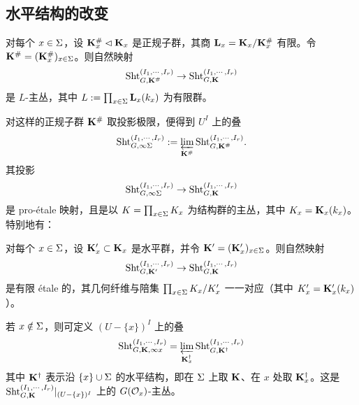\subsection{水平结构的改变}\label{ss:change level}


对每个 $x\in \Sigma$，设 $\mathbf{K}^{\#}_{x}\lhd \mathbf{K}_{x}$ 是正规子群，其商 $\mathbf{L}_{x}=\mathbf{K}_{x}/\mathbf{K}^{\#}_{x}$ 有限。令 $\mathbf{K}^{\#}=(\mathbf{K}^{\#}_{x})_{x\in \Sigma}$。则自然映射
\begin{equation*}
\textup{Sht}^{(I_{1},\cdots, I_{r})}_{G,\mathbf{K}^{\#}} \to \textup{Sht}^{(I_{1},\cdots, I_{r})}_{G,\mathbf{K}}
\end{equation*}
是 $L$-主丛，其中 $L:=\prod_{x\in \Sigma}\mathbf{L}_{x}(k_{x})$ 为有限群。

对这样的正规子群 $\mathbf{K}^{\#}$ 取投影极限，便得到 $U^{I}$ 上的叠
\begin{equation*}
\textup{Sht}^{(I_{1},\cdots, I_{r})}_{G,\infty\Sigma} :=\varprojlim_{\mathbf{K}^{\#}}\textup{Sht}^{(I_{1},\cdots, I_{r})}_{G,\mathbf{K}^{\#}}.
\end{equation*}
其投影
\begin{equation*}
\textup{Sht}^{(I_{1},\cdots, I_{r})}_{G,\infty\Sigma}\to \textup{Sht}^{(I_{1},\cdots, I_{r})}_{G,\mathbf{K}}
\end{equation*}
是 pro-\'etale 映射，且是以 $K=\prod_{x\in \Sigma}K_{x}$ 为结构群的主丛，其中 $K_{x}=\mathbf{K}_{x}(k_{x})$。特别地有：

\begin{lem}\label{l:change level Sig}
对每个 $x\in \Sigma$，设 $\mathbf{K}'_{x}\subset \mathbf{K}_{x}$ 是水平群，并令 $\mathbf{K}'=(\mathbf{K}'_{x})_{x\in \Sigma}$。则自然映射
\begin{equation*}
\textup{Sht}^{(I_{1},\cdots, I_{r})}_{G,\mathbf{K}'} \to \textup{Sht}^{(I_{1},\cdots, I_{r})}_{G,\mathbf{K}}
\end{equation*}
是有限 \'etale 的，其几何纤维与陪集 $\prod_{x\in \Sigma}K_{x}/K'_{x}$ 一一对应（其中 $K'_{x}=\mathbf{K}'_{x}(k_{x})$）。
\end{lem}

\label{sss:full x}

若 $x\notin \Sigma$，则可定义 $(U-\{x\})^{I}$ 上的叠
\begin{equation*}
\textup{Sht}^{(I_{1},\cdots, I_{r})}_{G,\mathbf{K},\infty x}=\varprojlim_{\mathbf{K}^{\dagger}_{x}}\textup{Sht}^{(I_{1},\cdots, I_{r})}_{G,\mathbf{K}^{\dagger}}
\end{equation*}
其中 $\mathbf{K}^{\dagger}$ 表示沿 $\{x\}\cup \Sigma$ 的水平结构，即在 $\Sigma$ 上取 $\mathbf{K}$、在 $x$ 处取 $\mathbf{K}^{\dagger}_{x}$。这是 $\textup{Sht}^{(I_{1},\cdots, I_{r})}_{G, \mathbf{K}}|_{(U-\{x\})^{I}}$ 上的 $G(\mathcal{O}_{x})$-主丛。

